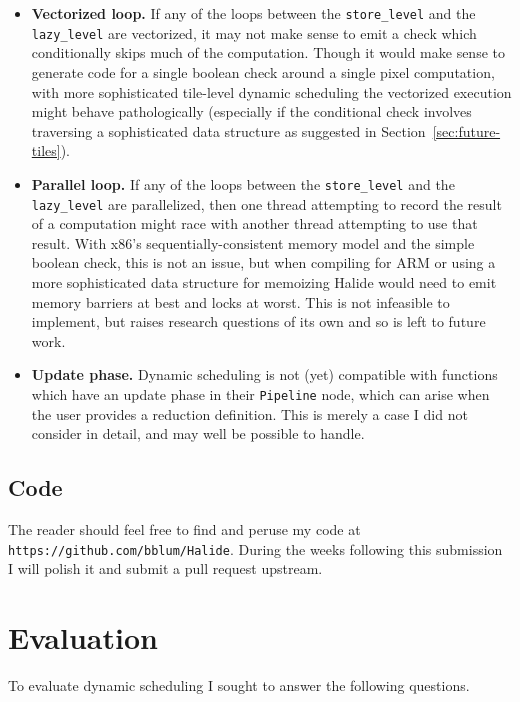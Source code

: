 \documentclass{article}
\begin{document}
\begin{itemize}
	\item {\bf Vectorized loop.} If any of the loops between the \texttt{store\_level} and the \texttt{lazy\_level} are vectorized, it may not make sense to emit a check which conditionally skips much of the computation. Though it would make sense to generate code for a single boolean check around a single pixel computation, with more sophisticated tile-level dynamic scheduling the vectorized execution might behave pathologically (especially if the conditional check involves traversing a sophisticated data structure as suggested in Section~\ref{sec:future-tiles}).
	\item {\bf Parallel loop.} If any of the loops between the \texttt{store\_level} and the \texttt{lazy\_level} are parallelized, then one thread attempting to record the result of a computation might race with another thread attempting to use that result. With x86's sequentially-consistent memory model and the simple boolean check, this is not an issue, but when compiling for ARM or using a more sophisticated data structure for memoizing Halide would need to emit memory barriers at best and locks at worst. This is not infeasible to implement, but raises research questions of its own and so is left to future work.
	\item {\bf Update phase.} Dynamic scheduling is not (yet) compatible with functions which have an update phase in their \texttt{Pipeline} node, which can arise when the user provides a reduction definition. This is merely a case I did not consider in detail, and may well be possible to handle.
\end{itemize}

\subsection{Code}

The reader should feel free to find and peruse my code at \texttt{https://github.com/bblum/Halide}. During the weeks following this submission I will polish it and submit a pull request upstream.

\section{Evaluation}

To evaluate dynamic scheduling I sought to answer the following questions.
\end{document}
